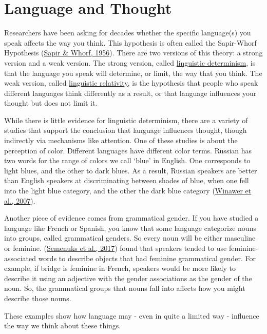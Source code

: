 \documentclass[
]{krantz}
\begin{document}
\hypertarget{language-and-thought}{%
\section{Language and Thought}\label{language-and-thought}}

Researchers have been asking for decades whether the specific language(s) you speak affects the way you think. This hypothesis is often called the Sapir-Whorf Hypothesis (\protect\hyperlink{ref-sapir-whorf1956}{Sapir \& Whorf, 1956}). There are two versions of this theory: a strong version and a weak version. The strong version, called \protect\hyperlink{linguistic-determinism}{linguistic determinism}, is that the language you speak will determine, or limit, the way that you think. The weak version, called \protect\hyperlink{linguistic-relativity}{linguistic relativity}, is the hypothesis that people who speak different languages think differently as a result, or that language influences your thought but does not limit it.

While there is little evidence for linguistic determinism, there are a variety of studies that support the conclusion that language influences thought, though indirectly via mechanisms like attention. One of these studies is about the perception of color. Different languages have different color terms. Russian has two words for the range of colors we call `blue' in English. One corresponds to light blues, and the other to dark blues. As a result, Russian speakers are better than English speakers at discriminating between shades of blue, when one fell into the light blue category, and the other the dark blue category (\protect\hyperlink{ref-winawer2007}{Winawer et al., 2007}).

Another piece of evidence comes from grammatical gender. If you have studied a language like French or Spanish, you know that some language categorize nouns into groups, called grammatical genders. So every noun will be either masculine or feminine. (\protect\hyperlink{ref-semenuks2017}{Semenuks et al., 2017}) found that speakers tended to use feminine-associated words to describe objects that had feminine grammatical gender. For example, if bridge is feminine in French, speakers would be more likely to describe it using an adjective with the gender associations as the gender of the noun. So, the grammatical groups that nouns fall into affects how you might describe those nouns.

These examples show how language may - even in quite a limited way - influence the way we think about these things.
\end{document}
